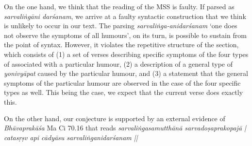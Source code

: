 On the one hand, we think that the reading of the MSS is faulty. If parsed as 
\textit{sarvaliṅgāni darśanam}, we arrive at a faulty syntactic construction that 
we think is unlikely to occur in our text. The parsing 
\textit{sarvaliṅga-anidarśanam} ‘one does not observe the symptoms of all 
humours’, on its turn, is possible to sustain from the point of syntax. However, it 
violates the repetitive structure of the section, which consists of (1) a set of verses 
describing specific symptoms of the four types of  associated 
with a particular humour, (2) a description of a general type of 
\textit{yonivyāpat}{} caused by the particular humour, and (3) a statement that 
the general symptoms of the particular humour are observed in the case of the 
four specific types as well. This being the case, we expect that the current verse 
does exactly this.

On the other hand, our conjecture is supported by an external evidence of 
\textit{Bhāvaprakāśa} Ma Ci 70.16 that reads \textit{sarvaliṅgasamutthānā 
sarvadoṣaprakopajā | catasṛṣv api cādyāsu sarvaliṅganidarśanam ||} 


